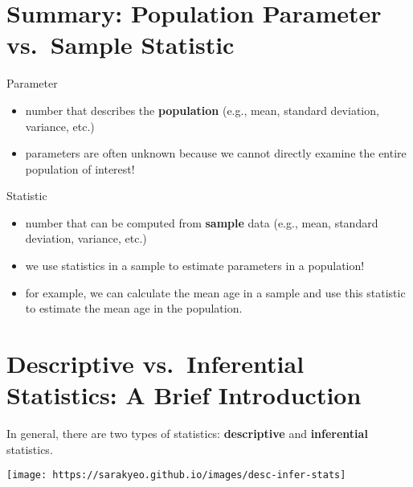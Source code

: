 \documentclass[
  ignorenonframetext,
]{beamer}
\providecommand{\tightlist}{%
  \setlength{\itemsep}{0pt}\setlength{\parskip}{0pt}}
\begin{document}
\hypertarget{summary-population-parameter-vs.-sample-statistic}{%
\section{Summary: Population Parameter vs.~Sample
Statistic}\label{summary-population-parameter-vs.-sample-statistic}}

\begin{frame}{Parameter}
\protect\hypertarget{parameter}{}
\begin{itemize}[<+->]
\tightlist
\item
  number that describes the \textbf{population} (e.g., mean, standard
  deviation, variance, etc.)
\item
  parameters are often unknown because we cannot directly examine the
  entire population of interest!
\end{itemize}
\end{frame}

\begin{frame}{Statistic}
\protect\hypertarget{statistic}{}
\begin{itemize}[<+->]
\tightlist
\item
  number that can be computed from \textbf{sample} data (e.g., mean,
  standard deviation, variance, etc.)
\item
  we use statistics in a sample to estimate parameters in a population!
\item
  for example, we can calculate the mean age in a sample and use this
  statistic to estimate the mean age in the population.
\end{itemize}
\end{frame}

\hypertarget{descriptive-vs.-inferential-statistics-a-brief-introduction}{%
\section{Descriptive vs.~Inferential Statistics: A Brief
Introduction}\label{descriptive-vs.-inferential-statistics-a-brief-introduction}}

\begin{frame}{}
\protect\hypertarget{section-8}{}
In general, there are two types of statistics: \textbf{descriptive} and
\textbf{inferential} statistics.

\begin{center}\texttt{[image: https://sarakyeo.github.io/images/desc-infer-stats]} \end{center}
\end{frame}
\end{document}
